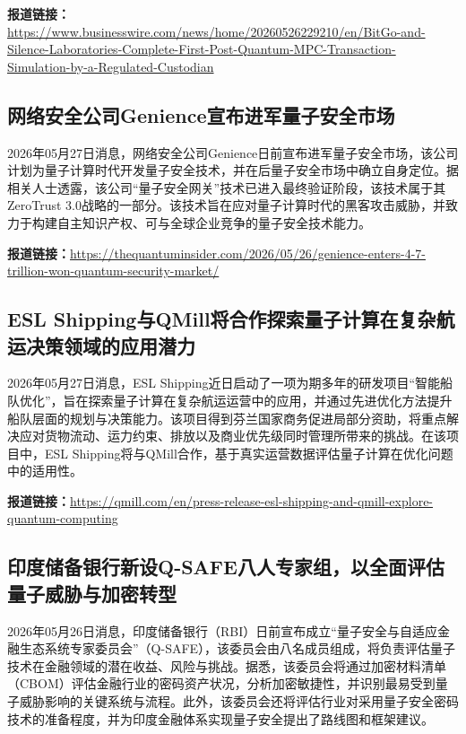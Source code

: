 \documentclass[12pt,a4paper]{ctexart}
\begin{document}
\noindent\textbf{报道链接：}\url{https://www.businesswire.com/news/home/20260526229210/en/BitGo-and-Silence-Laboratories-Complete-First-Post-Quantum-MPC-Transaction-Simulation-by-a-Regulated-Custodian}

\subsection{ 网络安全公司Genience宣布进军量子安全市场 }

2026年05月27日消息，网络安全公司Genience日前宣布进军量子安全市场，该公司计划为量子计算时代开发量子安全技术，并在后量子安全市场中确立自身定位。据相关人士透露，该公司“量子安全网关”技术已进入最终验证阶段，该技术属于其ZeroTrust 3.0战略的一部分。该技术旨在应对量子计算时代的黑客攻击威胁，并致力于构建自主知识产权、可与全球企业竞争的量子安全技术能力。

\noindent\textbf{报道链接：}\url{https://thequantuminsider.com/2026/05/26/genience-enters-4-7-trillion-won-quantum-security-market/}

\subsection{ ESL Shipping与QMill将合作探索量子计算在复杂航运决策领域的应用潜力 }

2026年05月27日消息，ESL Shipping近日启动了一项为期多年的研发项目“智能船队优化”，旨在探索量子计算在复杂航运运营中的应用，并通过先进优化方法提升船队层面的规划与决策能力。该项目得到芬兰国家商务促进局部分资助，将重点解决应对货物流动、运力约束、排放以及商业优先级同时管理所带来的挑战。在该项目中，ESL Shipping将与QMill合作，基于真实运营数据评估量子计算在优化问题中的适用性。

\noindent\textbf{报道链接：}\url{https://qmill.com/en/press-release-esl-shipping-and-qmill-explore-quantum-computing}

\subsection{ 印度储备银行新设Q-SAFE八人专家组，以全面评估量子威胁与加密转型 }

2026年05月26日消息，印度储备银行（RBI）日前宣布成立“量子安全与自适应金融生态系统专家委员会”（Q-SAFE），该委员会由八名成员组成，将负责评估量子技术在金融领域的潜在收益、风险与挑战。据悉，该委员会将通过加密材料清单（CBOM）评估金融行业的密码资产状况，分析加密敏捷性，并识别最易受到量子威胁影响的关键系统与流程。此外，该委员会还将评估行业对采用量子安全密码技术的准备程度，并为印度金融体系实现量子安全提出了路线图和框架建议。
\end{document}
